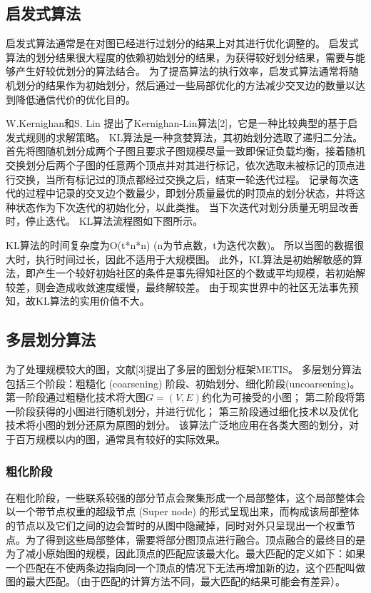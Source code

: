 \subsection{启发式算法}

启发式算法通常是在对图已经进行过划分的结果上对其进行优化调整的。
启发式算法的划分结果很大程度的依赖初始划分的结果，为获得较好划分结果，需要与能够产生好较优划分的算法结合。
为了提高算法的执行效率，启发式算法通常将随机划分的结果作为初始划分，然后通过一些局部优化的方法减少交叉边的数量以达到降低通信代价的优化目的。

W.Kernighan和S. Lin 提出了Kernighan-Lin算法[2]，它是一种比较典型的基于启发式规则的求解策略。
KL算法是一种贪婪算法，其初始划分选取了递归二分法。
首先将图随机划分成两个子图且要求子图规模尽量一致即保证负载均衡，接着随机交换划分后两个子图的任意两个顶点并对其进行标记，依次选取未被标记的顶点进行交换，当所有标记过的顶点都经过交换之后，结束一轮迭代过程。
记录每次迭代的过程中记录的交叉边个数最少，即划分质量最优的时顶点的划分状态，并将这种状态作为下次迭代的初始化分，以此类推。
当下次迭代对划分质量无明显改善时，停止迭代。
KL算法流程图如下图所示。

KL算法的时间复杂度为O(t*n*n) (n为节点数，t为迭代次数)。
所以当图的数据很大时，执行时间过长，因此不适用于大规模图。
此外，KL算法是初始解敏感的算法，即产生一个较好初始社区的条件是事先得知社区的个数或平均规模，若初始解较差，则会造成收敛速度缓慢，最终解较差。
由于现实世界中的社区无法事先预知，故KL算法的实用价值不大。

\subsection{多层划分算法}

为了处理规模较大的图，文献[3]提出了多层的图划分框架METIS。
多层划分算法包括三个阶段：粗糙化 (coarsening) 阶段、初始划分、细化阶段(uncoarsening)。
第一阶段通过粗糙化技术将大图$G=(V,E)$约化为可接受的小图；
第二阶段将第一阶段获得的小图进行随机划分，并进行优化；
第三阶段通过细化技术以及优化技术将小图的划分还原为原图的划分。
该算法广泛地应用在各类大图的划分，对于百万规模以内的图，通常具有较好的实际效果。

\subsubsection{粗化阶段}

在粗化阶段，一些联系较强的部分节点会聚集形成一个局部整体，这个局部整体会以一个带节点权重的超级节点 (Super node) 的形式呈现出来，而构成该局部整体的节点以及它们之间的边会暂时的从图中隐藏掉，同时对外只呈现出一个权重节点。为了得到这些局部整体，需要将部分图顶点进行融合。顶点融合的最终目的是为了减小原始图的规模，因此顶点的匹配应该最大化。最大匹配的定义如下：如果一个匹配在不使两条边指向同一个顶点的情况下无法再增加新的边，这个匹配叫做图的最大匹配。（由于匹配的计算方法不同，最大匹配的结果可能会有差异）。

